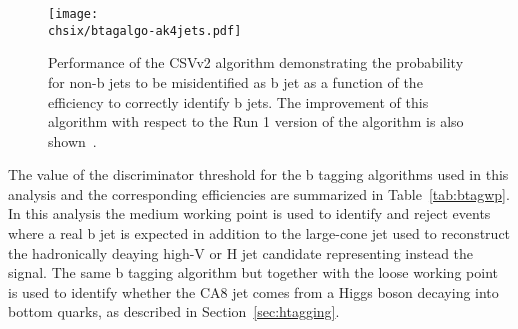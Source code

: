 \begin{figure}[!htb]
 \begin{center}
  \texttt{[image: \\chsix/btagalgo-ak4jets.pdf]}
 \end{center}
 \caption{Performance of the CSVv2 algorithm demonstrating the probability for non-b jets to be misidentified as b jet as a function of the efficiency to correctly identify b jets. The improvement of this algorithm with respect to the Run 1 version of the algorithm is also shown~\cite{CMS-PAS-BTV-15-001}.}
 \label{fig:btagalgo}
\end{figure}

The value of the discriminator threshold for the b tagging algorithms used in this analysis and the corresponding efficiencies are summarized in Table~\ref{tab:btagwp}. 
In this analysis the medium working point is used to identify and reject \ttbar events where a real b jet is expected in addition to the large-cone jet used to reconstruct the hadronically deaying high-\pt V or H jet candidate representing instead the signal. The same b tagging algorithm but together with the loose working point is used to identify whether the CA8 jet comes from a Higgs boson decaying into bottom quarks, as described in Section~\ref{sec:htagging}.

\begin{table}[!htb]
\centering
\caption{Taggers, discriminator threshold for Run 1 and Run 2 and corresponding efficiency for b jets with $\pt > 30\GeV$ in simulated \ttbar events. }
\label{tab:btagwp}
\end{table}

